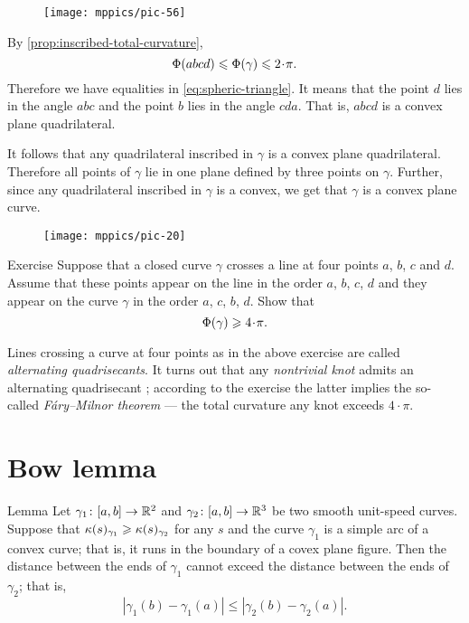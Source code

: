 \begin{wrapfigure}{r}{40 mm}
\vskip-7mm
\centering
\texttt{[image: mppics/pic-56]}
\vskip0mm
\end{wrapfigure}

By \ref{prop:inscribed-total-curvature},
\[\tc{abcd}\le \tc\gamma\le 2\cdot\pi.\]
Therefore we have equalities in \ref{eq:spheric-triangle}.
It means that the point $d$ lies in the angle $abc$ 
and the point $b$ lies in the angle $cda$.
That is, $abcd$ is a convex plane quadrilateral.

It follows that any quadrilateral inscribed in $\gamma$ is a convex plane quadrilateral.
Therefore all points of $\gamma$ lie in one plane defined by three points on $\gamma$.
Further, since any quadrilateral inscribed in $\gamma$ is a convex,
we get that $\gamma$ is a convex plane curve. 
\qeds

\begin{wrapfigure}{o}{30 mm}
\vskip-4mm
\centering
\texttt{[image: mppics/pic-20]}
\vskip0mm
\end{wrapfigure}

\begin{thm}{Exercise}\label{ex:quadrisecant}
Suppose that a closed curve $\gamma$ crosses a line at four points $a$, $b$, $c$ and $d$.
Assume that these points appear on the line in the order $a$, $b$, $c$, $d$
and they appear on the curve $\gamma$ in the order $a$, $c$, $b$, $d$.
Show that 
\[\tc\gamma\ge 4\cdot\pi.\]

\end{thm}

Lines crossing a curve at four points as in the above exercise are called \emph{alternating quadrisecants}.
It turns out that any {}\emph{nontrivial knot} admits an alternating quadrisecant \cite{denne};
according to the exercise the latter implies the so-called \emph{F\'ary--Milnor theorem} --- the total curvature any knot exceeds $4\cdot \pi$.

\section{Bow lemma}

\begin{thm}{Lemma}\label{lem:bow}
Let $\gamma_1\colon[a,b]\to\mathbb{R}^2$ and $\gamma_2\colon[a,b] \to\mathbb{R}^3$ be two smooth unit-speed curves.
Suppose that $\kappa(s)_{\gamma_1}\geqslant\kappa(s)_{\gamma_2}$ for any $s$ 
and the curve
$\gamma_1$ is a simple arc of a convex curve; that is, it runs in the boundary of a covex plane figure.
Then the distance between the ends of $\gamma_1$ cannot exceed the  distance between the ends of $\gamma_2$; that is,
\[|\gamma_1(b)-\gamma_1(a)|\le |\gamma_2(b)-\gamma_2(a)|.\]

\end{thm}

